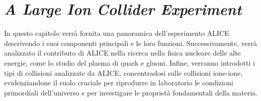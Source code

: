 \chapter{\textit{A Large Ion Collider Experiment}} \label{ch:alice}
In questo capitolo verrà fornita una panoramica dell'esperimento ALICE descrivendo i suoi componenti principali e le loro funzioni.
Successivamente, verrà analizzato il contributo di ALICE nella ricerca nella fisica nucleare delle alte energie, come lo studio del plasma di quark e gluoni. 
Infine, verranno introdotti i tipi di collisioni analizzate da ALICE, concentradosi sulle collisioni ione-ione, evidenziandone il ruolo cruciale per riprodurre in laboratorio le condizioni primordiali dell'universo e per investigare le proprietà fondamentali della materia.




